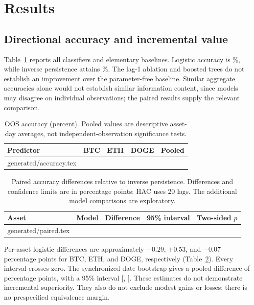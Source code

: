 \documentclass[preprint,12pt,authoryear]{elsarticle}
\makeatletter
\def\inputrows#1{\@@input #1 }
\makeatother
\begin{document}
\section{Results}
\subsection{Directional accuracy and incremental value}
Table~\ref{tab:accuracy} reports all classifiers and elementary baselines. Logistic accuracy is \LogisticAccuracy\%, while inverse persistence attains \InverseAccuracy\%. The lag-1 ablation and boosted trees do not establish an improvement over the parameter-free baseline. Similar aggregate accuracies alone would not establish similar information content, since models may disagree on individual observations; the paired results supply the relevant comparison.

\begin{table}[htbp]\centering\small
\caption{OOS accuracy (percent). Pooled values are descriptive asset-day averages, not independent-observation significance tests.}\label{tab:accuracy}
\begin{tabular}{lrrrr}\toprule
Predictor & BTC & ETH & DOGE & Pooled\\\midrule
\inputrows{generated/accuracy.tex}
\bottomrule\end{tabular}\end{table}

\begin{table}[htbp]\centering\small
\caption{Paired accuracy differences relative to inverse persistence. Differences and confidence limits are in percentage points; HAC uses 20 lags. The additional model comparisons are exploratory.}\label{tab:paired}
\begin{tabular}{llrrr}\toprule
Asset & Model & Difference & 95\% interval & Two-sided $p$\\\midrule
\inputrows{generated/paired.tex}
\bottomrule\end{tabular}\end{table}

Per-asset logistic differences are approximately $-0.29$, $+0.53$, and $-0.07$ percentage points for BTC, ETH, and DOGE, respectively (Table~\ref{tab:paired}). Every interval crosses zero. The synchronized date bootstrap gives a pooled difference of \PooledDifference{} percentage points, with a 95\% interval [\PooledLow, \PooledHigh]. These estimates do not demonstrate incremental superiority. They also do not exclude modest gains or losses; there is no prespecified equivalence margin.
\end{document}
